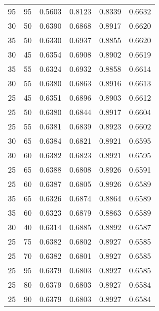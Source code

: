 \begin{center}
\begin{longtable}{|l|l|l|l|l|l|}
95                & 95                & 0.5603    & 0.8123 & 0.8339      & 0.6632    \\
30                & 50                & 0.6390    & 0.6868 & 0.8917      & 0.6620    \\
35                & 50                & 0.6330    & 0.6937 & 0.8855      & 0.6620    \\
30                & 45                & 0.6354    & 0.6908 & 0.8902      & 0.6619    \\
35                & 55                & 0.6324    & 0.6932 & 0.8858      & 0.6614    \\
30                & 55                & 0.6380    & 0.6863 & 0.8916      & 0.6613    \\
25                & 45                & 0.6351    & 0.6896 & 0.8903      & 0.6612    \\
25                & 50                & 0.6380    & 0.6844 & 0.8917      & 0.6604    \\
25                & 55                & 0.6381    & 0.6839 & 0.8923      & 0.6602    \\
30                & 65                & 0.6384    & 0.6821 & 0.8921      & 0.6595    \\
30                & 60                & 0.6382    & 0.6823 & 0.8921      & 0.6595    \\
25                & 65                & 0.6388    & 0.6808 & 0.8926      & 0.6591    \\
25                & 60                & 0.6387    & 0.6805 & 0.8926      & 0.6589    \\
35                & 65                & 0.6326    & 0.6874 & 0.8864      & 0.6589    \\
35                & 60                & 0.6323    & 0.6879 & 0.8863      & 0.6589    \\
30                & 40                & 0.6314    & 0.6885 & 0.8892      & 0.6587    \\
25                & 75                & 0.6382    & 0.6802 & 0.8927      & 0.6585    \\
25                & 70                & 0.6382    & 0.6801 & 0.8927      & 0.6585    \\
25                & 95                & 0.6379    & 0.6803 & 0.8927      & 0.6585    \\
25                & 80                & 0.6379    & 0.6803 & 0.8927      & 0.6584    \\
25                & 90                & 0.6379    & 0.6803 & 0.8927      & 0.6584    \\

\end{longtable}
\end{center}
